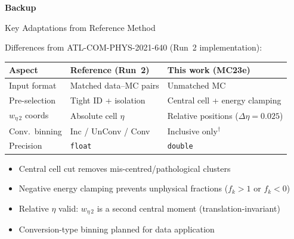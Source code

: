\documentclass[aspectratio=169,10pt]{beamer}
\begin{document}
\appendix
\begin{frame}[noframenumbering]
  \centering
  \Huge\bfseries\color{atlasblue}
  Backup
\end{frame}

\begin{frame}[noframenumbering]{Key Adaptations from Reference Method}

\small
Differences from ATL-COM-PHYS-2021-640 (Run~2 implementation):

\vspace{4pt}
\begin{tabular}{lll}
\toprule
\textbf{Aspect} & \textbf{Reference (Run~2)} & \textbf{This work (MC23e)} \\
\midrule
Input format     & Matched data--MC pairs     & Unmatched MC \\
Pre-selection    & Tight ID + isolation       & Central cell + energy clamping \\
$w_{\eta\,2}$ coords & Absolute cell $\eta$  & Relative positions
                       ($\Delta\eta\!=\!0.025$) \\
Conv.\ binning   & Inc / UnConv / Conv        & Inclusive only$^\dagger$ \\
Precision        & \texttt{float}             & \texttt{double} \\
\bottomrule
\end{tabular}

\vspace{8pt}
\begin{itemize}
  \item Central cell cut removes mis-centred/pathological clusters
  \item Negative energy clamping prevents unphysical fractions ($f_k > 1$
        or $f_k < 0$)
  \item Relative $\eta$ valid: $w_{\eta\,2}$ is a second central moment
        (translation-invariant)
  \item[$^\dagger$] Conversion-type binning planned for data application
\end{itemize}
\end{frame}
\end{document}
